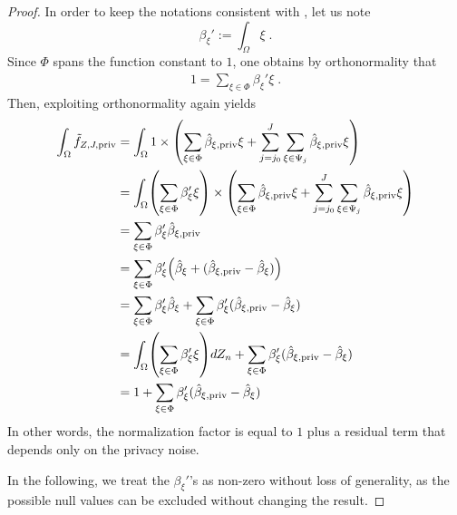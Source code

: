\documentclass{article}
\newcommand{\1}{\mathds{1}}
\DeclarePairedDelimiter{\paren}{\lparen}{\rparen}
\theoremstyle{plain}
\theoremstyle{definition}
\theoremstyle{remark}
\begin{document}
\begin{proof}
    In order to keep the notations consistent with \cite{Manole2024Plugin}, let us note 
    \begin{equation}
        \beta_{\xi}' := \int_\Omega \xi \;.
    \end{equation}
    Since $\Phi$ spans the function constant to $1$, one obtains by orthonormality that
    \begin{equation}
        \begin{aligned}
            1 = \sum_{\xi \in \Phi} \beta_{\xi}' \xi \;.
        \end{aligned}
    \end{equation}
    Then, exploiting orthonormality again yields
    \begin{equation}
        \begin{aligned}
            \int_{\Omega} \tilde{f}_{Z, J, \textrm{priv} } 
            &= 
            \int_{\Omega} 1 \times \paren*{\sum_{\xi \in \Phi} \hat{\beta}_{\xi, \textrm{priv}} \xi + \sum_{j = j_0 }^{J} \sum_{\xi \in \Psi_j} \hat{\beta}_{\xi, \textrm{priv}} \xi} \\
            &= 
            \int_{\Omega} \paren*{\sum_{\xi \in \Phi} \beta_{\xi}' \xi} \times \paren*{\sum_{\xi \in \Phi} \hat{\beta}_{\xi, \textrm{priv}} \xi + \sum_{j = j_0 }^{J} \sum_{\xi \in \Psi_j} \hat{\beta}_{\xi, \textrm{priv}} \xi} \\
            &= \sum_{\xi \in \Phi} \beta_{\xi}' \hat{\beta}_{\xi, \textrm{priv}} \\
            &= \sum_{\xi \in \Phi} \beta_{\xi}' \paren*{\hat{\beta}_{\xi} + (\hat{\beta}_{\xi, \textrm{priv}} - \hat{\beta}_{\xi})} \\
            &= \sum_{\xi \in \Phi} \beta_{\xi}' \hat{\beta}_{\xi} + \sum_{\xi \in \Phi} \beta_{\xi}' (\hat{\beta}_{\xi, \textrm{priv}} - \hat{\beta}_{\xi}) \\
            &= \int_{\Omega} \paren*{\sum_{\xi \in \Phi} \beta_{\xi}' \xi} dZ_n + \sum_{\xi \in \Phi} \beta_{\xi}' (\hat{\beta}_{\xi, \textrm{priv}} - \hat{\beta}_{\xi}) \\
            &= 1 +  \sum_{\xi \in \Phi} \beta_{\xi}' (\hat{\beta}_{\xi, \textrm{priv}} - \hat{\beta}_{\xi})
        \end{aligned}
    \end{equation}
    In other words, the normalization factor is equal to $1$ plus a residual term that depends only on the privacy noise.

In the following, we treat the $\beta_{\xi}'$'s as non-zero without loss of generality, as the possible null values can be excluded without changing the result.


\end{proof}
\end{document}
